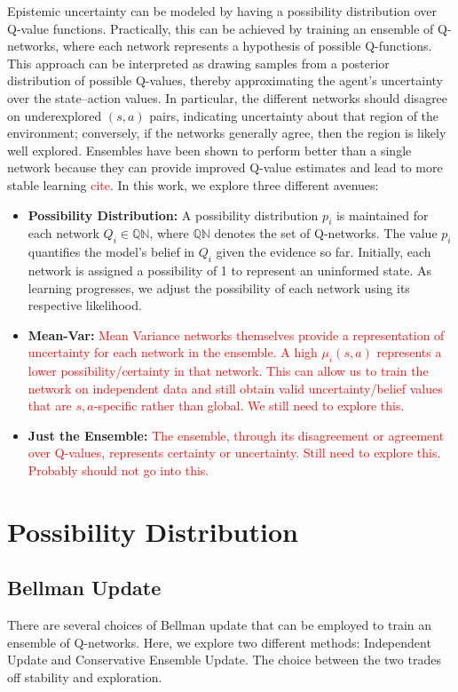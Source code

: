 \documentclass[12pt,a4paper]{report}
\newcommand\myworries[1]{\textcolor{red}{#1}}
\begin{document}
Epistemic uncertainty can be modeled by having a possibility distribution over Q-value functions. Practically, this can be achieved by training an ensemble of Q-networks, where each network represents a hypothesis of possible Q-functions. This approach can be interpreted as drawing samples from a posterior distribution of possible Q-values, thereby approximating the agent's uncertainty over the state–action values. In particular, the different networks should disagree on underexplored \((s,a)\) pairs, indicating uncertainty about that region of the environment; conversely, if the networks generally agree, then the region is likely well explored. Ensembles have been shown to perform better than a single network because they can provide improved Q-value estimates and lead to more stable learning \myworries{cite}. In this work, we explore three different avenues:
\begin{itemize}
  \item \textbf{Possibility Distribution:}  
  A possibility distribution \(p_i\) is maintained for each network \(Q_i \in \mathbb{QN}\), where \(\mathbb{QN}\) denotes the set of Q-networks. The value \(p_i\) quantifies the model's belief in \(Q_i\) given the evidence so far. Initially, each network is assigned a possibility of 1 to represent an uninformed state. As learning progresses, we adjust the possibility of each network using its respective likelihood.
  
  \item \textbf{Mean-Var:}  
  \myworries{Mean Variance networks themselves provide a representation of uncertainty for each network in the ensemble. A high \(\mu_i(s,a)\) represents a lower possibility/certainty in that network. This can allow us to train the network on independent data and still obtain valid uncertainty/belief values that are \(s,a\)-specific rather than global. We still need to explore this.}
  
  \item \textbf{Just the Ensemble:}  
  \myworries{The ensemble, through its disagreement or agreement over Q-values, represents certainty or uncertainty. Still need to explore this. Probably should not go into this. }
\end{itemize}

\section{Possibility Distribution}
\subsection{Bellman Update}
There are several choices of Bellman update that can be employed to train an ensemble of Q-networks. Here, we explore two different methods: Independent Update and Conservative Ensemble Update. The choice between the two trades off stability and exploration.
\end{document}
